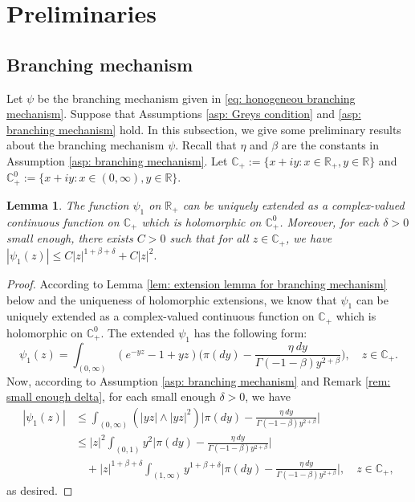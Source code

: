 \documentclass[12pt,a4paper]{amsart}
\theoremstyle{plain}
\newtheorem{lem}[thm]{Lemma}
\theoremstyle{definition}
\numberwithin{equation}{section}
\begin{document}
\section{Preliminaries}
\subsection{Branching mechanism}
\label{sec: branching mechanism}
Let $\psi$ be the branching mechanism given in \eqref{eq: honogeneou branching mechanism}.
Suppose that Assumptions \ref{asp: Greys condition} and \ref{asp: branching mechanism} hold.
In this subsection, we give some preliminary results about the branching mechanism $\psi$.
Recall that $\eta$ and $\beta$ are the constants in Assumption \ref{asp: branching mechanism}.
Let $\mathbb C_+:= \{x+iy: x\in \mathbb R_+, y \in \mathbb R\}$ and $\mathbb C^0_+:= \{x+iy: x\in (0,\infty), y \in \mathbb R\}$.
\begin{lem}
  \label{lem: complex extension for psi1}
	The function $\psi_1$ on $\mathbb R_+$ can be uniquely extended as a complex-valued continuous function on $\mathbb C_+$ which is holomorphic on $\mathbb C^0_+$.
  Moreover, for each $\delta > 0$ small enough, there exists $C>0$ such that for all $z\in \mathbb C_+$, we have
  $
	|\psi_1(z)| \leq C |z|^{1+\beta+\delta} + C|z|^2.
  $
\end{lem}
\begin{proof}
  According to Lemma \ref{lem: extension lemma for branching mechanism} below and the uniqueness of holomorphic extensions,
	we know that $\psi_1$ can be uniquely extended as a complex-valued continuous function on $\mathbb C_+$ which is holomorphic on $\mathbb C^0_+$.
	The extended $\psi_1$ has the following form:
  \[
    \psi_1(z)
    = \int_{(0,\infty)}(e^{-yz}-1+yz) \Big(\pi(dy) - \frac {\eta~dy} {\Gamma(-1-\beta)y^{2+\beta}} \Big)
    , \quad z\in \mathbb C_+.
  \]
	Now, according to  Assumption \ref{asp: branching mechanism} and Remark \ref{rem: small enough delta}, for each small enough $\delta > 0$, we have
  \begin{align}
    |\psi_1(z)|
    & \leq \int_{(0,\infty)} (|yz|\wedge |yz|^2) \Big|\pi(dy) - \frac{\eta~dy}{\Gamma(-1-\beta)y^{2+\beta}}\Big| \\
    & \leq  |z|^2\int_{(0,1)} y^2 \Big|\pi(dy) - \frac{\eta~dy}{\Gamma(-1-\beta)y^{2+\beta}}\Big| \\
    & \quad + |z|^{1+\beta +\delta}\int_{(1,\infty)} y^{1+\beta + \delta} \Big|\pi(dy) - \frac{\eta~dy}{\Gamma(-1-\beta)y^{2+\beta}}\Big|,
      \quad z \in \mathbb C_+,
  \end{align}
	as desired.
\end{proof}
\end{document}
